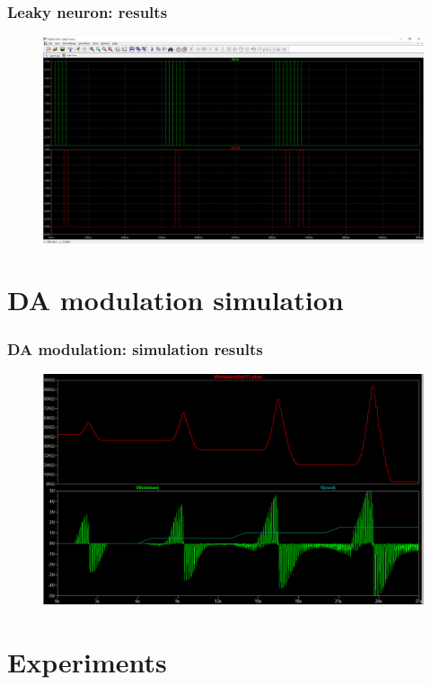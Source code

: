 \documentclass[12pt, aspectratio=169]{beamer}
\begin{document}

\begin{frame}
\frametitle{Leaky neuron: results}
\begin{figure}
\includegraphics[width=0.85\linewidth]{Leak_test}
\end{figure}
\end{frame}

\section{DA modulation simulation}

\begin{frame}
\frametitle{DA modulation: simulation results}
\begin{figure}
\includegraphics[width=0.8\linewidth]{da_modulation}
\end{figure}
\end{frame}

\section{Experiments}
\end{document}
